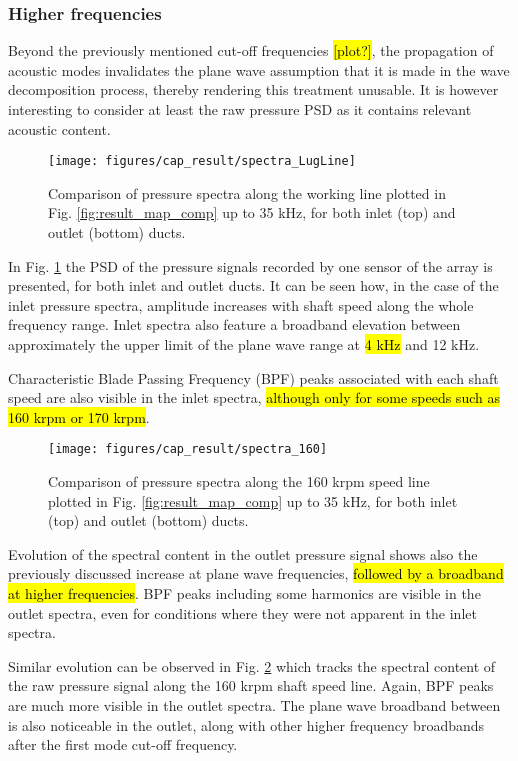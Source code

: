 \subsubsection{Higher frequencies}

Beyond the previously mentioned cut-off frequencies \hl{[plot?]}, the propagation of acoustic modes invalidates the plane wave assumption that it is made in the wave decomposition process, thereby rendering this treatment unusable. It is however interesting to consider at least the raw pressure PSD as it contains relevant acoustic content.

\begin{figure}[tbh!]
\centering
\texttt{[image: figures/cap\_result/spectra\_LugLine]}
\caption{Comparison of pressure spectra along the working line  plotted in Fig. \ref{fig:result_map_comp} up to 35 kHz, for both inlet (top) and outlet (bottom) ducts.}
\label{fig:result_spectra_LugLine}
\end{figure}

In Fig. \ref{fig:result_spectra_LugLine} the PSD of the pressure signals recorded by one sensor of the array is presented, for both inlet and outlet ducts. It can be seen how, in the case of the inlet pressure spectra, amplitude increases with shaft speed along the whole frequency range. Inlet spectra also feature a broadband elevation between approximately the upper limit of the plane wave range at \hl{4 kHz} and 12 kHz.

Characteristic Blade Passing Frequency (BPF) peaks associated with each shaft speed are also visible in the inlet spectra, \hl{although only for some speeds such as 160 krpm or 170 krpm}. 

\begin{figure}[tbh!]
\centering
\texttt{[image: figures/cap\_result/spectra\_160]}
\caption{Comparison of pressure spectra along the 160 krpm speed line plotted in Fig. \ref{fig:result_map_comp} up to 35 kHz, for both inlet (top) and outlet (bottom) ducts.}
\label{fig:result_spectra_160}
\end{figure}

Evolution of the spectral content in the outlet pressure signal shows also the previously discussed increase at plane wave frequencies, \hl{followed by a broadband at higher frequencies}. BPF peaks including some harmonics are visible in the outlet spectra, even for conditions where they were not apparent in the inlet spectra.

Similar evolution can be observed in Fig. \ref{fig:result_spectra_160} which tracks the spectral content of the raw pressure signal along the 160 krpm shaft speed line. Again, BPF peaks are much more visible in the outlet spectra. The plane wave broadband between is also noticeable in the outlet, along with other higher frequency broadbands after the first mode cut-off frequency.

